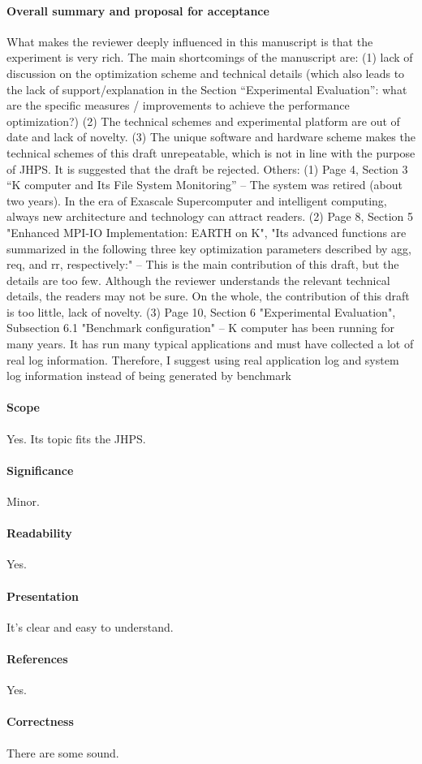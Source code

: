 \documentclass{jhps}
\begin{document}
\paragraph{Overall summary and proposal for acceptance}
What makes the reviewer deeply influenced in this manuscript is that the experiment is very rich. The main shortcomings of the manuscript are: (1) lack of discussion on the optimization scheme and technical details (which also leads to the lack of support/explanation in the Section “Experimental Evaluation”: what are the specific measures / improvements to achieve the performance optimization?) (2) The technical schemes and experimental platform are out of date and lack of novelty. (3) The unique software and hardware scheme makes the technical schemes of this draft unrepeatable, which is not in line with the purpose of JHPS. It is suggested that the draft be rejected.
Others: (1) Page 4, Section 3 “K computer and Its File System Monitoring” -- The system was retired (about two years). In the era of Exascale Supercomputer and intelligent computing, always new architecture and technology can attract readers. (2) Page 8, Section 5 "Enhanced MPI-IO Implementation: EARTH on K", "Its advanced functions are summarized in the following three key optimization parameters described by agg, req, and rr, respectively:" -- This is the main contribution of this draft, but the details are too few. Although the reviewer understands the relevant technical details, the readers may not be sure. On the whole, the contribution of this draft is too little, lack of novelty. (3) Page 10, Section 6 "Experimental Evaluation", Subsection 6.1 "Benchmark configuration" -- K computer has been running for many years. It has run many typical applications and must have collected a lot of real log information. Therefore, I suggest using real application log and system log information instead of being generated by benchmark
\paragraph{Scope}   %
Yes. Its topic fits the JHPS.
\paragraph{Significance}   %
Minor.
\paragraph{Readability}   %
Yes.
\paragraph{Presentation}
It's clear and easy to understand.
\paragraph{References}   %
Yes.
\paragraph{Correctness}   %
There are some sound.
\end{document}
